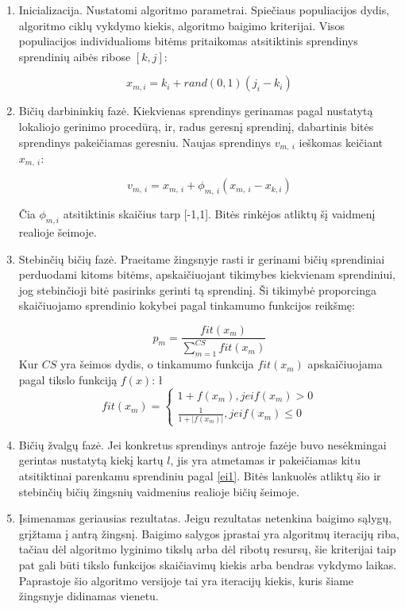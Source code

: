 \documentclass{VUMIFPSmagistrinis}
\begin{document}
\begin{enumerate}
    \item	Inicializacija. Nustatomi algoritmo parametrai. Spiečiaus populiacijos dydis, algoritmo ciklų vykdymo kiekis, algoritmo baigimo kriterijai. Visos populiacijos individualioms bitėms pritaikomas atsitiktinis sprendinys sprendinių aibės ribose $[k,j]$:

\begin{equation}\label{ei1}
x_{m,i}=k_{i}+rand(0,1)(j_{i}-k_{i})
\end{equation}


    \item 	Bičių darbininkių fazė. Kiekvienas sprendinys gerinamas pagal nustatytą lokaliojo gerinimo procedūrą, ir, radus geresnį sprendinį, dabartinis bitės sprendinys pakeičiamas geresniu. Naujas sprendinys $v_{m,\ i}$   ieškomas keičiant $x_{m,\ i}$:

\begin{equation}\label{eebp1}
v_{m,\ i}=x_{m,\ i} +\phi_{m,\ i} (x_{m,\ i} -x_{k,i} )
\end{equation}

Čia $\phi_{m,i}$ atsitiktinis skaičius tarp [-1,1]. Bitės rinkėjos atliktų šį vaidmenį realioje šeimoje.

    \item 	Stebinčių bičių fazė. Praeitame žingsnyje rasti ir gerinami bičių sprendiniai perduodami kitoms bitėms, apskaičiuojant tikimybes kiekvienam sprendiniui, jog stebinčioji bitė pasirinks gerinti tą sprendinį. Ši tikimybė proporcinga skaičiuojamo sprendinio kokybei pagal tinkamumo funkcijos reikšmę:

\begin{equation}
\label{eobp1}
p_m=\frac{fit(x_m)}{\sum_{m=1}^{CS}{fit(x_m)}}
\end{equation}
Kur $CS$ yra šeimos dydis, o tinkamumo funkcija $fit(x_m)$ apskaičiuojama pagal tikslo funkciją $f(x)$:
\l \begin{equation}\label{efit}
fit(x_m)=
\begin{cases}
1+f(x_m), jei f(x_m)>0\\
\frac{1}{1+|f(x_m)|}, jei f(x_m)\leq0
\end{cases}
\end{equation}


    \item 	Bičių žvalgų fazė. Jei konkretus sprendinys antroje fazėje buvo nesėkmingai gerintas nustatytą kiekį kartų $l$, jis yra atmetamas ir pakeičiamas kitu atsitiktinai parenkamu sprendiniu pagal \eqref{ei1}. Bitės lankuolės atliktų šio ir stebinčių bičių žingsnių vaidmenius realioje bičių šeimoje.

    \item 	Įsimenamas geriausias rezultatas. Jeigu rezultatas netenkina baigimo sąlygų, grįžtama į antrą žingsnį. Baigimo salygos įprastai yra algoritmų iteracijų riba, tačiau dėl algoritmo lyginimo tikslų arba dėl ribotų resursų, šie kriterijai taip pat gali būti tikslo funkcijos skaičiavimų kiekis arba bendras vykdymo laikas. Paprastoje šio algoritmo versijoje tai yra iteracijų kiekis, kuris šiame žingsnyje didinamas vienetu.

\end{enumerate}
\end{document}

